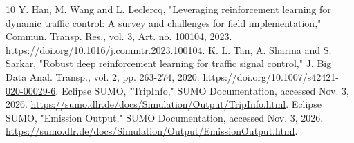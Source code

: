\documentclass[conference]{IEEEtran}
\begin{document}
\begin{thebibliography}{10}
 Y. Han, M. Wang and L. Leclercq, "Leveraging reinforcement learning for dynamic traffic control: A survey and challenges for field implementation," Commun. Transp. Res., vol. 3, Art. no. 100104, 2023. \url{https://doi.org/10.1016/j.commtr.2023.100104}.
 K. L. Tan, A. Sharma and S. Sarkar, "Robust deep reinforcement learning for traffic signal control," J. Big Data Anal. Transp., vol. 2, pp. 263-274, 2020. \url{https://doi.org/10.1007/s42421-020-00029-6}.
 Eclipse SUMO, "TripInfo," SUMO Documentation, accessed Nov. 3, 2026. \url{https://sumo.dlr.de/docs/Simulation/Output/TripInfo.html}.
 Eclipse SUMO, "Emission Output," SUMO Documentation, accessed Nov. 3, 2026. \url{https://sumo.dlr.de/docs/Simulation/Output/EmissionOutput.html}.
\end{thebibliography}
\end{document}
